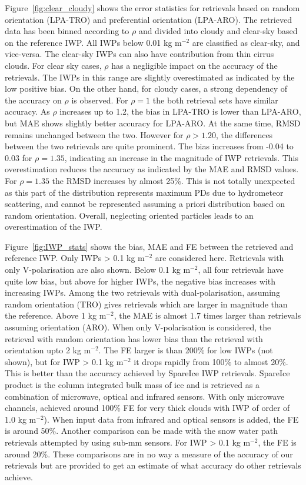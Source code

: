 \documentclass[amt, manuscript]{copernicus}
\begin{document}
Figure~\ref{fig:clear_cloudy} shows the error statistics for retrievals based on random orientation (LPA-TRO) and preferential orientation (LPA-ARO). The retrieved data has been binned according to $\rho$ and divided into cloudy and clear-sky based on the reference IWP.  All IWPs below 0.01\,\,kg m$^{-2}$ are classified as clear-sky, and vice-versa. The clear-sky IWPs can also have contribution from thin cirrus clouds. For clear sky cases, $\rho$ has a negligible impact on the accuracy of the retrievals. The IWPs in this range are slightly overestimated as indicated by the low positive bias. On the other hand, for cloudy cases, a strong dependency of the accuracy on $\rho$ is observed. For $\rho = 1$ the both retrieval sets have similar accuracy. As $\rho$ increases up to 1.2, the bias in LPA-TRO is lower than LPA-ARO, but MAE shows slightly better accuracy for LPA-ARO. At the same time, RMSD remains unchanged between the two. However for $\rho > 1.20$, the differences between the two retrievals are quite prominent. The bias increases from -0.04 to 0.03 for $\rho = 1.35$, indicating an increase in the magnitude of IWP retrievals. This overestimation reduces the accuracy as indicated by the MAE and RMSD values. For $\rho = 1.35$ the RMSD increases by almost 25\%. This is  not totally unexpected as this part of the distribution represents maximum PDs due to hydrometeor scattering, and cannot be represented assuming a priori distribution based on random orientation. Overall, neglecting oriented particles leads to an overestimation of the IWP. 


Figure~\ref{fig:IWP_stats} shows the bias, MAE and FE between the retrieved and reference IWP. Only IWPs > 0.1\,\,kg m$^{-2}$ are considered here. Retrievals with only V-polarisation are also shown.  Below 0.1\,\,kg m$^{-2}$, all four retrievals have quite low bias, but above for higher IWPs, the negative bias increases with increasing IWPs. Among the two retrievals with dual-polarisation, assuming random orientation (TRO) gives retrievals which are larger in magnitude than the reference. Above 1\,\,kg m$^{-2}$, the MAE is almost 1.7 times larger than retrievals assuming orientation (ARO). When only V-polarisation is considered, the retrieval with random orientation has lower bias than the retrieval with orientation upto 2\,\,kg m$^{-2}$. 
The FE larger is than 200\% for low IWPs (not shown), but for IWP > 0.1\,\,kg m$^{-2}$ it drops rapidly from 100\% to almost 20\%. This is better than the accuracy achieved by SpareIce IWP retrievals. SpareIce product is the column integrated bulk mass of ice and is retrieved as a combination of microwave, optical and infrared sensors. With only microwave channels, \citet{holl:spare:14} achieved around 100\% FE for very thick clouds with IWP of order of 1.0\,\,kg m$^{-2}$). When input data from infrared and optical sensors is added, the FE is around 50\%. Another comparison can be made with the snow water path retrievals attempted by \citet{brath:ismar:18} using sub-mm sensors. For IWP > 0.1\,\,kg m$^{-2}$, the FE is around 20\%. These comparisons are in no way a measure of the accuracy of our retrievals but are provided to get an estimate of what accuracy do other retrievals achieve.
\end{document}
